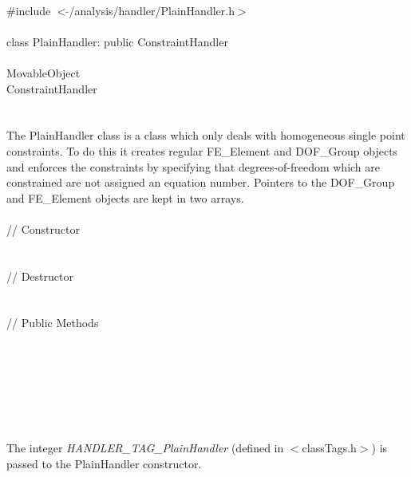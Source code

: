
   \\
\indent \#include $<\tilde{ }$/analysis/handler/PlainHandler.h$>$  \\

  \\
\indent class PlainHandler: public ConstraintHandler  \\

 \\
\indent MovableObject \\
\indent\indent ConstraintHandler \\
\indent\indent{} \\

 \\ 
\indent The PlainHandler class is a class which only deals with
homogeneous single point constraints. To do this it creates regular
FE\_Element and DOF\_Group objects and enforces the constraints by
specifying that degrees-of-freedom which are constrained are not
assigned an equation number. Pointers to the DOF\_Group and
FE\_Element objects are kept in two arrays. \\

 \\
\indent // Constructor \\
\\  \\
\indent // Destructor \\
\\  \\
\indent // Public Methods\\
 \\ 
 \\ \\
 \\
 \\

 \\
\\ 
The integer {\em HANDLER\_TAG\_PlainHandler} (defined in
$<$classTags.h$>$) is passed to the PlainHandler constructor. \\

